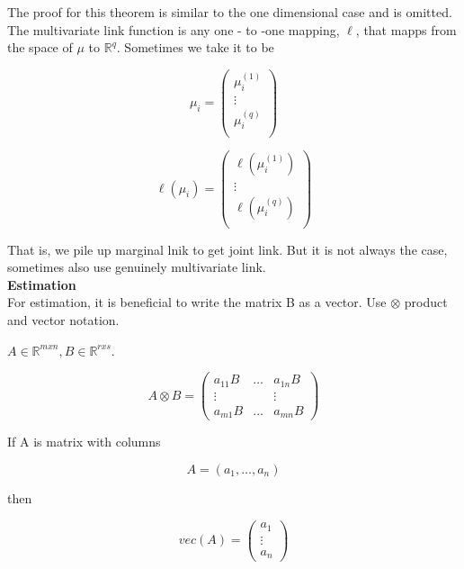 \documentclass[11pt,fleqn]{book} %
\begin{document}
The proof for this theorem is similar to the one dimensional case and is omitted.\\

The multivariate link function is any one - to -one mapping, $\ell$, that mapps from the space of $\mu$ to $\mathbb{R}^q$. Sometimes we take it to be 

		$$\mu_i = \begin{pmatrix}
			\mu_i^{(1)}\\
			\vdots\\
			\mu_i^{(q)}\\
		\end{pmatrix} $$


		$$\ell(\mu_i) = \begin{pmatrix}
			\ell(\mu_i^{(1)})\\
			\vdots\\
			\ell(\mu_i^{(q)})\\
		\end{pmatrix} $$

That is, we pile up marginal lnik to get joint link. But it is not always the case, sometimes also use genuinely multivariate link. \\

\textbf{Estimation}\\

For estimation, it is beneficial to write the matrix B as a vector. Use $\otimes$ product and vector notation. 

\begin{definition}
	$A \in \mathbb{R}^{mxn}, B \in \mathbb{R}^{r x s}$. 

			$$A \otimes B = \begin{pmatrix}
				a_{11}B & \dots & a_{1n} B\\
				\vdots & & \vdots\\
				a_{m1}B & \dots & a_{mn} B
			\end{pmatrix} $$
\end{definition}

\begin{definition}
	If A is matrix with columns 

		$$A = (a_1, \dots, a_n)$$

	then

		$$vec(A) = \begin{pmatrix}
			a_1\\
			\vdots\\
			a_n
		\end{pmatrix} $$
\end{definition}
\end{document}
